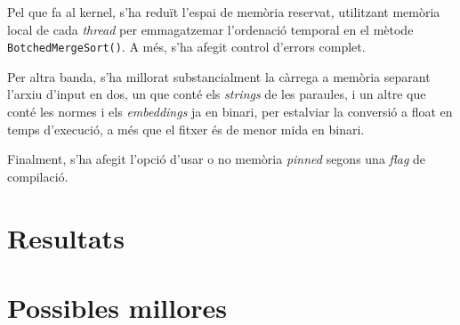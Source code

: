 \documentclass[catalan,10pt,a4paper]{article}
\begin{document}
Pel que fa al kernel, s'ha reduït l'espai de memòria reservat, utilitzant memòria local de cada \textit{thread} per emmagatzemar l'ordenació temporal en el mètode \verb|BotchedMergeSort()|. A més, s'ha afegit control d'errors complet.

Per altra banda, s'ha millorat substancialment la càrrega a memòria separant l'arxiu d'input en dos, un que conté els \textit{strings} de les paraules, i un altre que conté les normes i els \textit{embeddings} ja en binari, per estalviar la conversió a float en temps d'execució, a més que el fitxer és de menor mida en binari.

Finalment, s'ha afegit l'opció d'usar o no memòria \textit{pinned} segons una \textit{flag} de compilació.

\section*{Resultats}

\section*{Possibles millores}

\newpage


\end{document}
